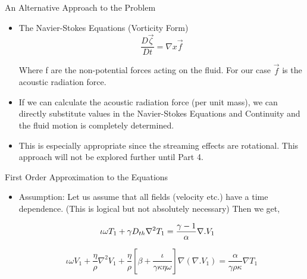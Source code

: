 \documentclass{beamer}
\begin{document}
\begin{frame}{An Alternative Approach to the Problem}

\begin{itemize}

\item The Navier-Stokes Equations (Vorticity Form)\begin{equation}
\frac{D\vec{\zeta}}{Dt} = \nabla x \vec{f}
\end{equation}

Where f are the non-potential forces acting on the fluid. For our case $\vec{f}$ is the acoustic radiation force. 

\item If we can calculate the acoustic radiation force (per unit mass), we can directly substitute values in the Navier-Stokes Equations and Continuity and the fluid motion is completely determined.

\item This is especially appropriate since the streaming effects are rotational. This approach will not be explored further until Part 4.


\end{itemize}
\end{frame}

\begin{frame}{First Order Approximation to the Equations}

\begin{itemize}

\item Assumption:  Let us assume that all fields (velocity etc.) have a time dependence. (This is logical but not absolutely necessary)
Then we get,

\begin{equation}
\begin{split}
\MoveEqLeft
\iota \omega T_1 + \gamma D_{th} \nabla ^ 2 T_1 = \frac{\gamma - 1}{\alpha} \nabla . V_1
\end{split}
\end{equation}

\begin{equation}
\iota \omega V_1  + \frac{\eta}{\rho} \nabla^2 V_1 + \frac{\eta}{\rho} [ \beta + \frac{\iota}{\gamma \kappa \eta \omega}] \nabla(\nabla . V_1) = \frac{\alpha}{\gamma \rho \kappa} \nabla T_1
\end{equation}

\end{itemize}
\end{frame}
\end{document}
